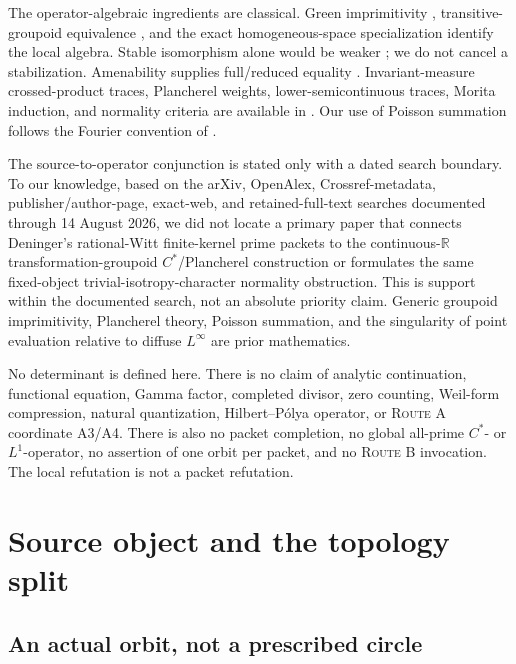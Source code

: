 \documentclass[11pt]{article}
\theoremstyle{definition}
\newcommand{\R}{\mathbb{R}}
\newcommand{\RouteA}{\textsc{Route A}}
\begin{document}
The operator-algebraic ingredients are classical.  Green imprimitivity \cite[Proposition~3, p.~203]{Green1978}, transitive-groupoid equivalence \cite[Theorems~2.8 and~3.1, pp.~10 and~16]{MuhlyRenaultWilliams1987}, and the exact homogeneous-space specialization \cite[equation~(4.63) and Theorem~4.30, p.~138]{Williams2007} identify the local algebra.  Stable isomorphism alone would be weaker \cite[Theorem~1.2, pp.~351--352]{BrownGreenRieffel1977}; we do not cancel a stabilization.  Amenability supplies full/reduced equality \cite[Examples~2.7(2) and Theorem~5.3]{AnantharamanDelaroche2002}.  Invariant-measure crossed-product traces, Plancherel weights, lower-semicontinuous traces, Morita induction, and normality criteria are available in \cite{BourneRennie2018,Renault2021,ElliottRobertSantiago2011,CombesZettl1983,Jones2009}.  Our use of Poisson summation follows the Fourier convention of \cite[Definition~14.1 and Theorem~23.5]{Laugesen2017}.

The source-to-operator conjunction is stated only with a dated search boundary.  To our knowledge, based on the arXiv, OpenAlex, Crossref-metadata, publisher/author-page, exact-web, and retained-full-text searches documented through 14 August 2026, we did not locate a primary paper that connects Deninger's rational-Witt finite-kernel prime packets to the continuous-\(\R\) transformation-groupoid \(C^*\)/Plancherel construction or formulates the same fixed-object trivial-isotropy-character normality obstruction.  This is support within the documented search, not an absolute priority claim.  Generic groupoid imprimitivity, Plancherel theory, Poisson summation, and the singularity of point evaluation relative to diffuse \(L^\infty\) are prior mathematics.

No determinant is defined here.  There is no claim of analytic continuation, functional equation, Gamma factor, completed divisor, zero counting, Weil-form compression, natural quantization, Hilbert--Pólya operator, or \RouteA{} coordinate A3/A4.  There is also no packet completion, no global all-prime \(C^*\)- or \(L^1\)-operator, no assertion of one orbit per packet, and no \textsc{Route B} invocation.  The local refutation is not a packet refutation.

\section{Source object and the topology split}

\subsection{An actual orbit, not a prescribed circle}
\end{document}
